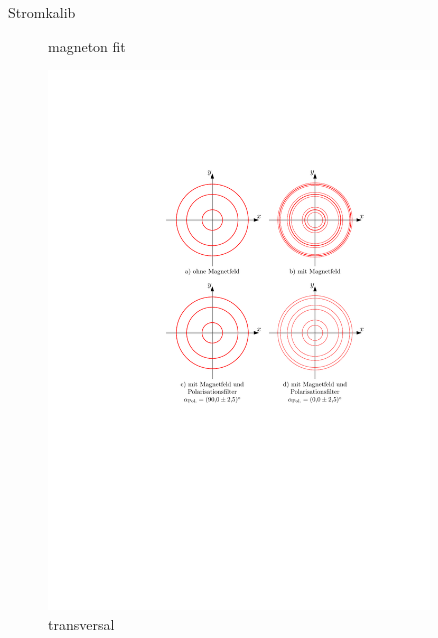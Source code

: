 \documentclass[11pt, a4paper]{article}
\begin{document}
\begin{table}[h]
	\centering
	
	\caption{Stromkalib}
	\label{tab:mittelwert_kalibration}
\end{table}


\begin{figure}[h]
	\centering
	
	\caption{magneton fit}
	\label{fig:magneton_fit}
\end{figure}


\begin{figure}[h]
	\centering
	\includegraphics[width=0.9\textwidth]{./figures/zeeman_transversal.pdf}
	\caption{transversal}
	\label{fig:zeeman_transversal}
\end{figure}
\end{document}

